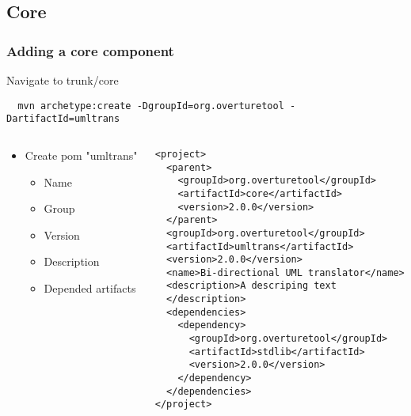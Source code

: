 \subsection{Core}
\begin{frame}[fragile]
  \frametitle{Adding a core component}
  
  Navigate to trunk/core
   
  \begin{lstlisting}
  mvn archetype:create -DgroupId=org.overturetool -DartifactId=umltrans
  \end{lstlisting}

\begin{columns}
\begin{column}{5cm}
	\begin{itemize}
		\item Create pom "umltrans"
		\begin{itemize}
			\item Name
			\item Group
			\item Version
			\item Description
			\item Depended artifacts
		\end{itemize}
		
	 \end{itemize}
\end{column}
\begin{column}{6cm}
	\pause
	\begin{lstlisting}
<project>
  <parent>
    <groupId>org.overturetool</groupId>
    <artifactId>core</artifactId>
    <version>2.0.0</version>
  </parent>
  <groupId>org.overturetool</groupId>
  <artifactId>umltrans</artifactId>
  <version>2.0.0</version>
  <name>Bi-directional UML translator</name>
  <description>A descriping text
  </description>
  <dependencies>
    <dependency>
      <groupId>org.overturetool</groupId>
      <artifactId>stdlib</artifactId>
      <version>2.0.0</version>
    </dependency>
  </dependencies>
</project>
	\end{lstlisting}
\end{column}
\end{columns}


\end{frame}

